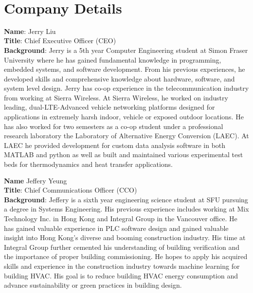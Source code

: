 \
\setcounter{section}{5}
\section{Company Details}

\bigskip
\textbf{Name}: Jerry Liu \\
\medskip
\textbf{Title}: Chief Executive Officer (CEO) \\
\medskip
\textbf{Background}: Jerry is a 5th year Computer Engineering student at Simon Fraser University where he has gained fundamental knowledge in programming, embedded systems, and  software development. From his previous experiences, he developed skills and comprehensive knowledge about hardware, software, and system level design. Jerry has co-op experience in the telecommunication industry from working at Sierra Wireless. At Sierra Wireless, he worked on industry leading, dual-LTE-Advanced vehicle networking platforms designed for applications in extremely harsh indoor, vehicle or exposed outdoor locations. He has also worked for two semesters as a co-op student under a professional research laboratory the Laboratory of Alternative Energy Conversion (LAEC). At LAEC he provided development for custom data analysis software in both MATLAB and python as well as built and maintained various experimental test beds for thermodynamics and heat transfer applications.

\bigskip
\bigskip
\textbf{Name} Jeffery Yeung \\
\medskip
\textbf{Title}: Chief Communications Officer (CCO)\\
\medskip
\textbf{Background}:
Jeffery is a sixth year engineering science student at SFU pursuing a degree in Systems Engineering. His previous experience includes 
working at Mix Technology Inc. in Hong Kong and Integral Group in the Vancouver office. He has gained valuable experience in PLC software
design and gained valuable insight into Hong Kong's diverse and booming construction industry. His time at Integral Group further cemented
his understanding of building verification and the importance of proper building commissioning. He hopes to apply his acquired skills and experience
in the construction industry towards machine learning for building HVAC. His goal is to reduce building HVAC energy consumption and 
advance sustainability or green practices in building design.

